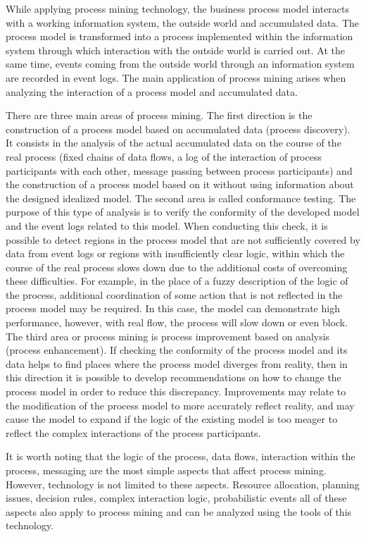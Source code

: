 \documentclass[
11pt,%
tightenlines,%
twoside,%
onecolumn,%
nofloats,%
nobibnotes,%
nofootinbib,%
superscriptaddress,%
noshowpacs,%
centertags]%
{revtex4}
\begin{document}
While applying process mining technology, the business process model interacts with a working information system, the outside world and accumulated data.
The process model is transformed into a process implemented within the information system through which interaction with the outside world is carried out.
At the same time, events coming from the outside world through an information system are recorded in event logs.
The main application of process mining arises when analyzing the interaction of a process model and accumulated data.

There are three main areas of process mining.
The first direction is the construction of a process model based on accumulated data (process discovery).
It consists in the analysis of the actual accumulated data on the course of the real process (fixed chains of data flows, a log of the interaction of process participants with each other, message passing between process participants) and the construction of a process model based on it without using information about the designed idealized model.
The second area is called conformance testing.
The purpose of this type of analysis is to verify the conformity of the developed model and the event logs related to this model.
When conducting this check, it is possible to detect regions in the process model that are not sufficiently covered by data from event logs or regions with insufficiently clear logic, within which the course of the real process slows down due to the additional costs of overcoming these difficulties.
For example, in the place of a fuzzy description of the logic of the process, additional coordination of some action that is not reflected in the process model may be required.
In this case, the model can demonstrate high performance, however, with real flow, the process will slow down or even block.
The third area or process mining is process improvement based on analysis (process enhancement).
If checking the conformity of the process model and its data helps to find places where the process model diverges from reality, then in this direction it is possible to develop recommendations on how to change the process model in order to reduce this discrepancy.
Improvements may relate to the modification of the process model to more accurately reflect reality, and may cause the model to expand if the logic of the existing model is too meager to reflect the complex interactions of the process participants.

It is worth noting that the logic of the process, data flows, interaction within the process, messaging are the most simple aspects that affect process mining.
However, technology is not limited to these aspects.
Resource allocation, planning issues, decision rules, complex interaction logic, probabilistic events all of these aspects also apply to process mining and can be analyzed using the tools of this technology.
\end{document}
